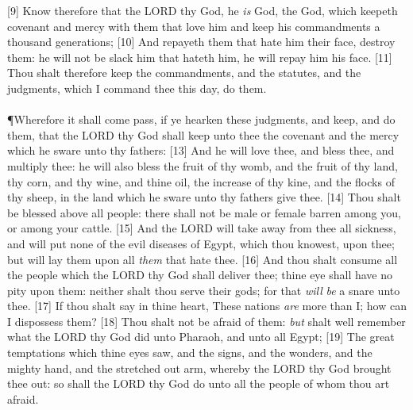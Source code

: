 [9] \textcolor[cmyk]{0.99998,1,0,0}{Know therefore that the LORD thy God, he \emph{is} God, the  God, which keepeth covenant and mercy with them that love him and keep his commandments a thousand generations;}
[10] \textcolor[cmyk]{0.99998,1,0,0}{And repayeth them that hate him their face, destroy them: he will not be slack him that hateth him, he will repay him his face.}
[11] \textcolor[cmyk]{0.99998,1,0,0}{Thou shalt therefore keep the commandments, and the statutes, and the judgments, which I command thee this day, do them.}\\
\\
\P \textcolor[cmyk]{0.99998,1,0,0}{Wherefore it shall come pass, if ye hearken these judgments, and keep, and do them, that the LORD thy God shall keep unto thee the covenant and the mercy which he sware unto thy fathers:}
[13] \textcolor[cmyk]{0.99998,1,0,0}{And he will love thee, and bless thee, and multiply thee: he will also bless the fruit of thy womb, and the fruit of thy land, thy corn, and thy wine, and thine oil, the increase of thy kine, and the flocks of thy sheep, in the land which he sware unto thy fathers give thee.}
[14] \textcolor[cmyk]{0.99998,1,0,0}{Thou shalt be blessed above all people: there shall not be male or female barren among you, or among your cattle.}
[15] \textcolor[cmyk]{0.99998,1,0,0}{And the LORD will take away from thee all sickness, and will put none of the evil diseases of Egypt, which thou knowest, upon thee; but will lay them upon all \emph{them} that hate thee.}
[16] \textcolor[cmyk]{0.99998,1,0,0}{And thou shalt consume all the people which the LORD thy God shall deliver thee; thine eye shall have no pity upon them: neither shalt thou serve their gods; for that \emph{will} \emph{be} a snare unto thee.}
[17] \textcolor[cmyk]{0.99998,1,0,0}{If thou shalt say in thine heart, These nations \emph{are} more than I; how can I dispossess them?}
[18] \textcolor[cmyk]{0.99998,1,0,0}{Thou shalt not be afraid of them: \emph{but} shalt well remember what the LORD thy God did unto Pharaoh, and unto all Egypt;}
[19] \textcolor[cmyk]{0.99998,1,0,0}{The great temptations which thine eyes saw, and the signs, and the wonders, and the mighty hand, and the stretched out arm, whereby the LORD thy God brought thee out: so shall the LORD thy God do unto all the people of whom thou art afraid.}
